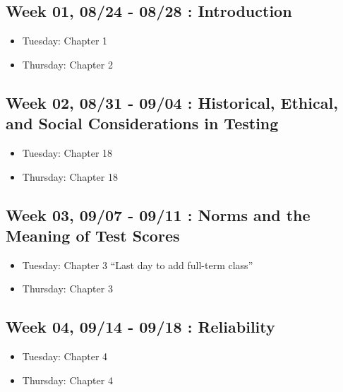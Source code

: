 \documentclass[11pt,]{article}
\providecommand{\tightlist}{%
  \setlength{\itemsep}{0pt}\setlength{\parskip}{0pt}}
\begin{document}
\hypertarget{week-01-0824---0828-introduction}{%
\subsection{Week 01, 08/24 - 08/28 :
Introduction}\label{week-01-0824---0828-introduction}}

\begin{itemize}
\tightlist
\item
  Tuesday: Chapter 1
\item
  Thursday: Chapter 2
\end{itemize}

\hypertarget{week-02-0831---0904-historical-ethical-and-social-considerations-in-testing}{%
\subsection{Week 02, 08/31 - 09/04 : Historical, Ethical, and Social
Considerations in
Testing}\label{week-02-0831---0904-historical-ethical-and-social-considerations-in-testing}}

\begin{itemize}
\tightlist
\item
  Tuesday: Chapter 18
\item
  Thursday: Chapter 18
\end{itemize}

\hypertarget{week-03-0907---0911-norms-and-the-meaning-of-test-scores}{%
\subsection{Week 03, 09/07 - 09/11 : Norms and the Meaning of Test
Scores}\label{week-03-0907---0911-norms-and-the-meaning-of-test-scores}}

\begin{itemize}
\tightlist
\item
  Tuesday: Chapter 3 ``Last day to add full-term class''
\item
  Thursday: Chapter 3
\end{itemize}

\hypertarget{week-04-0914---0918-reliability}{%
\subsection{Week 04, 09/14 - 09/18 :
Reliability}\label{week-04-0914---0918-reliability}}

\begin{itemize}
\tightlist
\item
  Tuesday: Chapter 4
\item
  Thursday: Chapter 4
\end{itemize}
\end{document}
